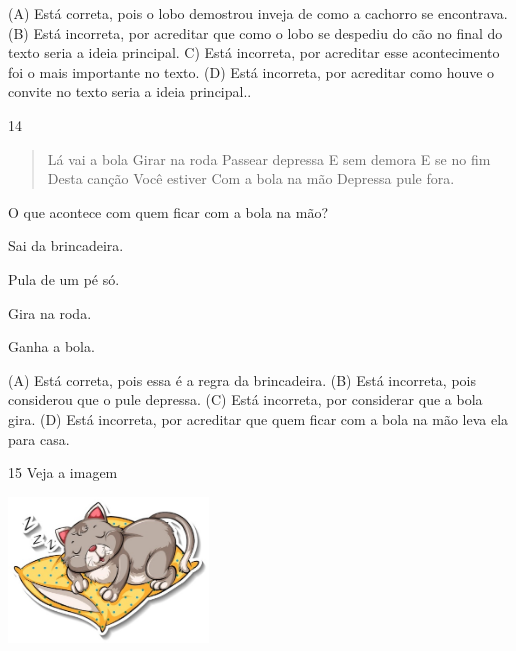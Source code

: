 
(A) Está correta, pois o lobo demostrou inveja de como a cachorro se encontrava.
(B) Está incorreta, por acreditar que como o lobo se despediu do cão no
final do texto seria a ideia principal.
C) Está incorreta, por acreditar esse acontecimento foi o mais
importante no texto.
(D) Está incorreta, por acreditar como houve o convite no texto seria a
ideia principal..

\num{14}

\begin{verse}
Lá vai a bola
Girar na roda
Passear depressa
E sem demora
E se no fim
Desta canção
Você estiver
Com a bola na mão
Depressa pule fora.
\end{verse}


O que acontece com quem ficar com a bola na mão?

\begin{escolha}
\item Sai da brincadeira.

\item Pula de um pé só.

\item Gira na roda.

\item Ganha a bola.
\end{escolha}


(A) Está correta, pois essa é a regra da brincadeira.
(B) Está incorreta, pois considerou que o pule depressa.
(C) Está incorreta, por considerar que a bola gira.
(D) Está incorreta, por acreditar que quem ficar com a bola na mão leva ela para casa.

\num{15} Veja a imagem

\includegraphics[width=2.09091in,height=1.52916in]{media/image161.jpeg}


